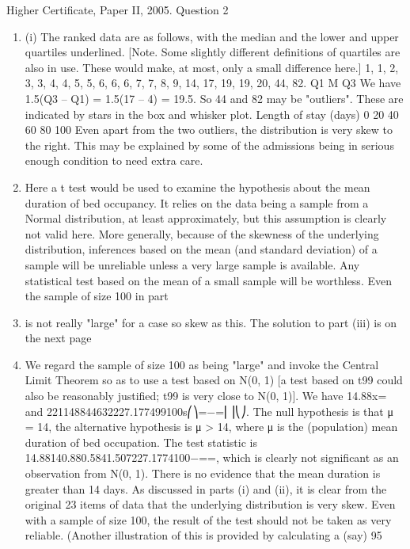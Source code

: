 \documentclass[a4paper,12pt]{article}
\begin{document}
Higher Certificate, Paper II, 2005. Question 2
\begin{enumerate}
\item 
(i) The ranked data are as follows, with the median and the lower and upper quartiles underlined. [Note. Some slightly different definitions of quartiles are also in use. These would make, at most, only a small difference here.]
1, 1, 2, 3, 3, 4, 4, 5, 5, 6, 6, 6, 7, 7, 8, 9, 14, 17, 19, 19, 20, 44, 82.
Q1 M Q3
We have 1.5(Q3 – Q1) = 1.5(17 – 4) = 19.5. So 44 and 82 may be "outliers". These are indicated by stars in the box and whisker plot.
Length of
stay (days)
0
20
40
60
80
100
Even apart from the two outliers, the distribution is very skew to the right. This may be explained by some of the admissions being in serious enough condition to need extra care.
\item  Here a t test would be used to examine the hypothesis about the mean duration of bed occupancy. It relies on the data being a sample from a Normal distribution, at least approximately, but this assumption is clearly not valid here. More generally, because of the skewness of the underlying distribution, inferences based on the mean (and standard deviation) of a sample will be unreliable unless a very large sample is available. Any statistical test based on the mean of a small sample will be worthless. Even the sample of size 100 in part \item  is not really "large" for a case so skew as this.
The solution to part (iii) is on the next page
\item  We regard the sample of size 100 as being "large" and invoke the Central Limit Theorem so as to use a test based on N(0, 1) [a test based on t99 could also be reasonably justified; t99 is very close to N(0, 1)].
We have 14.88x= and 221148844632227.177499100s⎛⎞=−=⎜⎟⎝⎠.
The null hypothesis is that μ = 14, the alternative hypothesis is μ > 14, where μ is the (population) mean duration of bed occupation.
The test statistic is 14.88140.880.5841.507227.1774100−==, which is clearly not significant as an observation from N(0, 1). There is no evidence that the mean duration is greater than 14 days.
As discussed in parts (i) and (ii), it is clear from the original 23 items of data that the underlying distribution is very skew. Even with a sample of size 100, the result of the test should not be taken as very reliable. (Another illustration of this is provided by calculating a (say) 95%
\end{enumerate}
\end{document}
